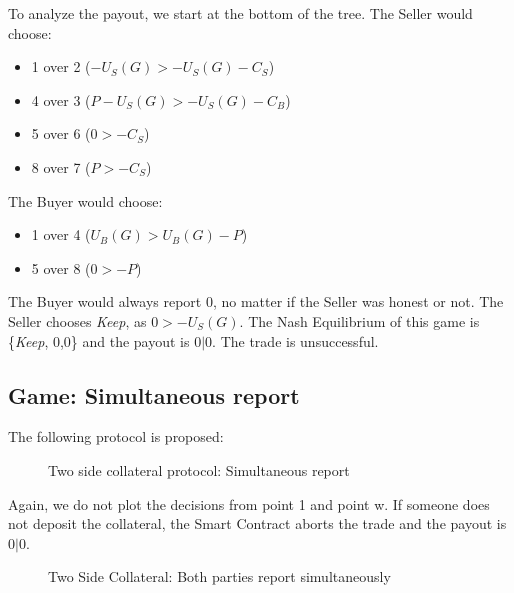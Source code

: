 \documentclass{cacthesis}
\begin{document}
To analyze the payout, we start at the bottom of the tree. The Seller would choose:
\begin{itemize}
    \item 1 over 2 ($-U_S(G) > -U_S(G) -C_S$)
    \item 4 over 3 ($P -U_S(G) > -U_S(G) -C_B$)
    \item 5 over 6 ($0 > -C_S$)
    \item 8 over 7 ($P >-C_S$)
\end{itemize}
The Buyer would choose:
\begin{itemize}
    \item 1 over 4 ($U_B(G) > U_B(G) - P$)
    \item 5 over 8 ($0 > -P$)
\end{itemize}
The Buyer would always report 0, no matter if the Seller was honest or not.
The Seller chooses \emph{Keep}, as $0>-U_S(G)$. The Nash Equilibrium of this game is \{\emph{Keep}, 0,0\} and the payout is $0|0$. The trade is unsuccessful.

\subsection{Game: Simultaneous report}
The following protocol is proposed:
\begin{figure}[htb!]
    \centering
    \caption{Two side collateral protocol: Simultaneous report}
    \label{pro:two-side-collateral-simultaneous}
\end{figure}

Again, we do not plot the decisions from point 1 and point w. If someone does not deposit the collateral, the Smart Contract aborts the trade and the payout is $0|0$.\newline
\begin{figure}[htb!]
    \centering
    \caption{Two Side Collateral: Both parties report simultaneously}
\end{figure}
\end{document}
